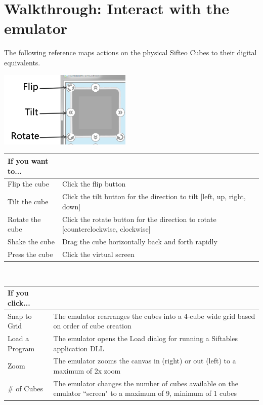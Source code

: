\documentclass[12pt]{article}
\begin{document}
\section{Walkthrough: Interact with the emulator}
The following reference maps actions on the physical Sifteo Cubes to their digital equivalents.
\begin{center}\includegraphics[width=2.5in]{interact}\end{center}
\begin{center}
	\begin{tabular}{ | p{1.5in} | p{4.5in} | }
	\hline
	\textbf{If you want to...} &  \\\hline
	Flip the cube  & Click the flip button \\\hline
	Tilt the cube & Click the tilt button for the direction to tilt [left, up, right, down] \\\hline
	Rotate the cube & Click the rotate button for the direction to rotate [counterclockwise, clockwise] \\\hline
	Shake the cube & Drag the cube horizontally back and forth rapidly \\\hline
	Press the cube & Click the virtual screen \\\hline
	\end{tabular}\\

	\begin{tabular}{ | p{1.5in} | p{4.5in} | }
	\hline
	\textbf{If you click...} &  \\\hline
	Snap to Grid & The emulator rearranges the cubes into a 4-cube wide grid based on order of cube creation \\\hline
	Load a Program & The emulator opens the Load dialog for running a Siftables application DLL \\\hline
	Zoom  & The emulator zooms the canvas in (right) or out (left) to a maximum of 2x zoom \\\hline
	\# of Cubes & The emulator changes the number of cubes available on the emulator ``screen" to a maximum of 9, minimum of 1 cubes \\\hline
	\end{tabular}

\end{center}
\end{document}
